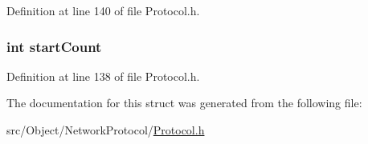 Definition at line 140 of file Protocol.h.

\hypertarget{struct_header_spck_a9d86e57aaa1003de664fdbe3fe6bc35a}{
\subsubsection[{startCount}]{\setlength{\rightskip}{0pt plus 5cm}int {\bf startCount}}}
\label{struct_header_spck_a9d86e57aaa1003de664fdbe3fe6bc35a}


Definition at line 138 of file Protocol.h.



The documentation for this struct was generated from the following file:\begin{DoxyCompactItemize}
\item 
src/Object/NetworkProtocol/\hyperlink{_protocol_8h}{Protocol.h}\end{DoxyCompactItemize}
